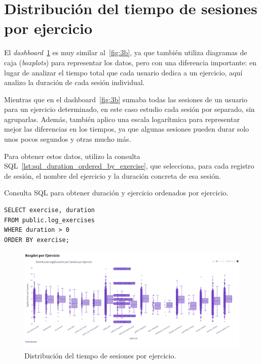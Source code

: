 \documentclass[a4paper, 12pt]{book}
\begin{document}
\section{Distribución del tiempo de sesiones por ejercicio}
\label{sec:dash3c}

El \textit{dashboard}~\ref{fig:3c} es muy similar al~\ref{fig:3b}, ya que también utiliza diagramas de caja (\textit{boxplots}) para representar los datos, pero con una diferencia importante: en lugar de analizar el tiempo total que cada usuario dedica a un ejercicio, aquí analizo la duración de cada sesión individual.

Mientras que en el dashboard~\ref{fig:3b} sumaba todas las sesiones de un usuario para un ejercicio determinado, en este caso estudio cada sesión por separado, sin agruparlas. Además, también aplico una escala logarítmica para representar mejor las diferencias en los tiempos, ya que algunas sesiones pueden durar solo unos pocos segundos y otras mucho más.

Para obtener estos datos, utilizo la consulta SQL~\ref{lst:sql_duration_ordered_by_exercise}, que selecciona, para cada registro de sesión, el nombre del ejercicio y la duración concreta de esa sesión.

\begin{listing}[h!]
\caption{Consulta SQL para obtener duración y ejercicio ordenados por ejercicio.}
\label{lst:sql_duration_ordered_by_exercise}
\begin{verbatim}
SELECT exercise, duration
FROM public.log_exercises
WHERE duration > 0
ORDER BY exercise;
\end{verbatim}
\end{listing}

\begin{figure}[H]
  \centering
  \includegraphics[width=1.1\textwidth]{img/3c.png}
  \caption{Distribución del tiempo de sesiones por ejercicio.}
  \label{fig:3c}
\end{figure}
\end{document}
